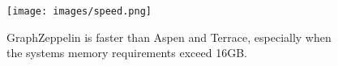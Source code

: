 \begin{figure}
\begin{center}
\texttt{[image: images/speed.png]}
\end{center} 
\caption{GraphZeppelin is faster than Aspen and Terrace, especially when the systems memory requirements exceed 16GB.
}
\end{figure}